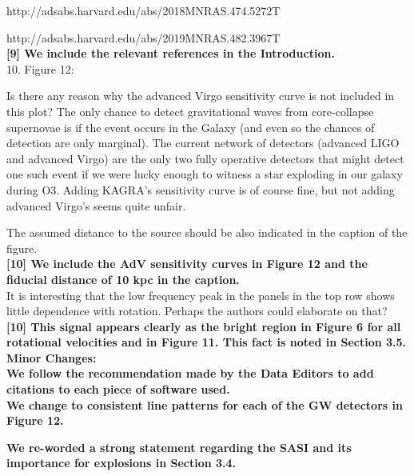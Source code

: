 \documentclass[11pt]{article}
\begin{document}
http://adsabs.harvard.edu/abs/2018MNRAS.474.5272T

http://adsabs.harvard.edu/abs/2019MNRAS.482.3967T\\

\textbf{[9] We include the relevant references in the Introduction.}\\

10. Figure 12:

Is there any reason why the advanced Virgo sensitivity curve is not included in this plot? The only chance to detect gravitational waves from core-collapse supernovae is  if the event occurs in the Galaxy (and even so the chances of detection are only marginal). The current network of detectors (advanced LIGO and advanced Virgo) are the only two fully operative detectors that might detect one such event if we were lucky enough to witness a star exploding in our galaxy during O3. Adding KAGRA's sensitivity curve is of course fine, but not adding advanced Virgo's seems quite unfair.

The assumed distance to the source should be also indicated in the caption of the 
figure.\\

\textbf{[10] We include the AdV sensitivity curves in Figure 12 and the fiducial distance of 10 kpc in the caption.}\\

It is interesting that the low frequency peak in the panels in the top row shows 
little dependence with rotation. Perhaps the authors could elaborate on that?\\

\textbf{[10] This signal appears clearly as the bright region in Figure 6 for all rotational velocities and in Figure 11.  This fact is noted in Section 3.5.}\\

\textbf{Minor Changes:}\\

\textbf{We follow the recommendation made by the Data Editors to add citations to each piece of software used.}\\

\textbf{We change to consistent line patterns for each of the GW detectors in Figure 12.}

\textbf{We re-worded a strong statement regarding the SASI and its importance for explosions in Section 3.4.}

% 
%
% 
%
% 

\newpage

\setcounter{page}{1}  \renewcommand{\thepage}
           {Bibliography -- \arabic{page}}

\renewcommand\bibsection{\section*{References}}
\setlength{\bibsep}{2pt}

\end{document}
